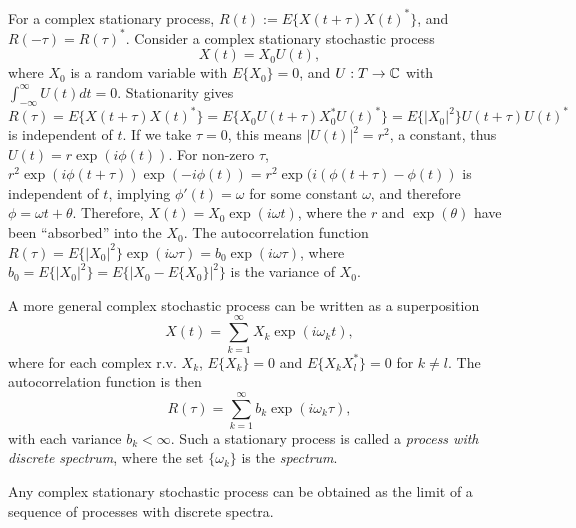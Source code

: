 For a complex stationary process, $R(t):=E\{X(t+\tau)X(t)^*\}$, and $R(-\tau)=R(\tau)^*$. Consider a complex stationary stochastic process 
\begin{equation}
X(t)=X_0 U(t),
\end{equation}
where $X_0$ is a random variable with $E\{X_0\}=0$, and $U:T\rightarrow \mathbb{C}$ with $\int_{-\infty}^{\infty} U(t)dt =0$. Stationarity gives $R(\tau)=E\{X(t+\tau)X(t)^*\}=E\{X_0 U(t+\tau) X_0^*U(t)^*\}=E\{|X_0|^2\}U(t+\tau)U(t)^*$ is independent of $t$. If we take $\tau=0$, this means $|U(t)|^2=r^2$, a constant, thus $U(t)=r\exp (i\phi(t))$. For non-zero $\tau$, $r^2 \exp (i\phi(t+\tau))\exp (-i\phi(t))=r^2 \exp (i(\phi(t+\tau)-\phi(t))$ is independent of $t$, implying $\phi'(t)=\omega$ for some constant $\omega$, and therefore $\phi=\omega t + \theta$. Therefore, $X(t)=X_0 \exp(i\omega t)$, where the $r$ and $\exp(\theta)$ have been ``absorbed'' into the $X_0$. The autocorrelation function $R(\tau)=E\{|X_0|^2\}\exp(i\omega \tau )=b_0 \exp(i\omega \tau )$, where $b_0=E\{|X_0|^2\}=E\{|X_0-E\{X_0\}|^2\}$ is the variance of $X_0$.

A more general complex stochastic process can be written as a superposition 
\begin{equation}
X(t)=\sum_{k=1}^{\infty}X_k \exp(i\omega_k t),
\end{equation}
where for each complex r.v. $X_k$, $E\{X_k\}=0$ and $E\{X_k X_l^* \}=0$ for $k\neq l$. The autocorrelation function is then 
\begin{equation}
R(\tau)=\sum_{k=1}^{\infty} b_k \exp(i\omega_k \tau),
\end{equation}
with each variance $b_k < \infty$. Such a stationary process is called a \textit{process with discrete spectrum}, where the set $\{\omega_k\}$ is the \textit{spectrum}.

Any complex stationary stochastic process can be obtained as the limit of a sequence of processes with discrete spectra. 

